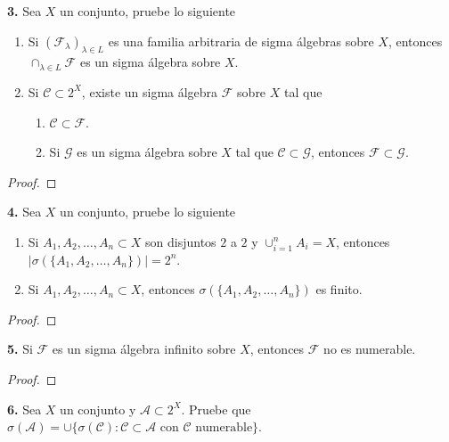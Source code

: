 \documentclass{article}
\newenvironment{statement}[1]{\smallskip\noindent\color[rgb]{1.00,0.00,0.50} {\bf #1.}}{}
\theoremstyle{definition}
\theoremstyle{remark}
\begin{document}
\begin{statement}{3}
  Sea $X$ un conjunto, pruebe lo siguiente
  \begin{enumerate}
    \item Si $(\mathcal{F}_{\lambda})_{\lambda \in L}$ es una familia arbitraria de sigma \'algebras sobre $X$, entonces $\cap_{\lambda \in L} \mathcal{F}$ es un sigma \'algebra sobre $X$.
    \item Si $\mathcal{C} \subset 2^X$, existe un sigma \'algebra $\mathcal{F}$ sobre $X$ tal que
      \begin{enumerate}
        \item $\mathcal{C} \subset \mathcal{F}$.
        \item Si $\mathcal{G}$ es un sigma \'algebra sobre $X$ tal que $\mathcal{C} \subset \mathcal{G}$, entonces $\mathcal{F} \subset \mathcal{G}$.
      \end{enumerate}
  \end{enumerate}
\end{statement}

\begin{proof}
\end{proof}

\begin{statement}{4}
  Sea $X$ un conjunto, pruebe lo siguiente
  \begin{enumerate}
    \item Si $A_1, A_2, \dots, A_n \subset X$ son disjuntos $2$ a $2$ y $\cup_{i = 1}^n A_i = X$, entonces $|\sigma(\{A_1, A_2, \dots, A_n\})| = 2^n$.
    \item Si $A_1, A_2, \dots, A_n \subset X$, entonces $\sigma(\{A_1, A_2, \dots, A_n\})$ es finito.
  \end{enumerate}
\end{statement}

\begin{proof}
\end{proof}

\begin{statement}{5}
  Si $\mathcal{F}$ es un sigma \'algebra infinito sobre $X$, entonces $\mathcal{F}$ no es numerable.
\end{statement}

\begin{proof}
\end{proof}

\begin{statement}{6}
  Sea $X$ un conjunto y $\mathcal{A} \subset 2^X$. Pruebe que $\sigma(\mathcal{A}) = \cup \{\sigma(\mathcal{C}) : \mathcal{C} \subset \mathcal{A} \text{ con } \mathcal{C} \text{ numerable}\}$.
\end{statement}
\end{document}
